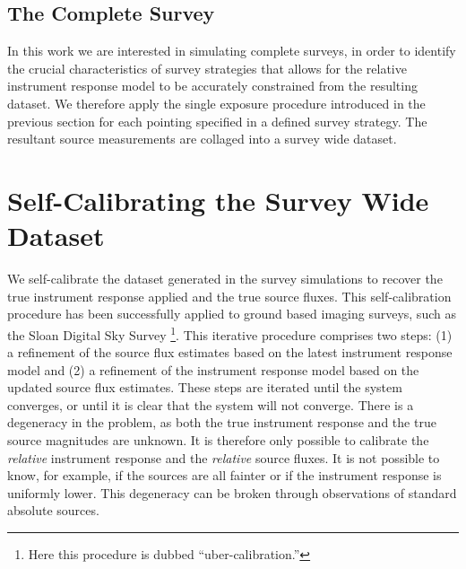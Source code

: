 \documentclass[manuscript]{aastex}
\begin{document}
\subsection{The Complete Survey}
In this work we are interested in simulating complete surveys, in order to identify the crucial characteristics of survey strategies that allows for the relative instrument response model to be accurately constrained from the resulting dataset. We therefore apply the single exposure procedure introduced in the previous section for each pointing specified in a defined survey strategy. The resultant source measurements are collaged into a survey wide dataset. 

\section{Self-Calibrating the Survey Wide Dataset}
\label{sec:self_cal}
We self-calibrate the dataset generated in the survey simulations to recover the true instrument response applied and the true source fluxes. This self-calibration procedure has been successfully applied to ground based imaging surveys, such as the Sloan Digital Sky Survey \citep{pad08}\footnote{Here this procedure is dubbed ``uber-calibration.''}. This iterative procedure comprises two steps: (1) a refinement of the source flux estimates based on the latest instrument response model and (2) a refinement of the instrument response model based on the updated source flux estimates. These steps are iterated until the system converges, or until it is clear that the system will not converge. There is a degeneracy in the problem, as both the true instrument response and the true source magnitudes are unknown. It is therefore only possible to calibrate the \textit{relative} instrument response and the \textit{relative} source fluxes. It is not possible to know, for example, if the sources are all fainter or if the instrument response is uniformly lower. This degeneracy can be broken through observations of standard absolute sources.
\end{document}
